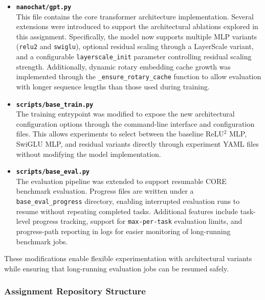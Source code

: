 \begin{itemize}

\item \textbf{\texttt{nanochat/gpt.py}} \\
This file contains the core transformer architecture implementation.
Several extensions were introduced to support the architectural ablations
explored in this assignment. Specifically, the model now supports multiple
MLP variants (\texttt{relu2} and \texttt{swiglu}), optional residual
scaling through a LayerScale variant, and a configurable
\texttt{layerscale\_init} parameter controlling residual scaling strength.
Additionally, dynamic rotary embedding cache growth was implemented through
the \texttt{\_ensure\_rotary\_cache} function to allow evaluation with longer
sequence lengths than those used during training.

\item \textbf{\texttt{scripts/base\_train.py}} \\
The training entrypoint was modified to expose the new architectural
configuration options through the command-line interface and configuration
files. This allows experiments to select between the baseline ReLU$^2$ MLP,
SwiGLU MLP, and residual variants directly through experiment YAML files
without modifying the model implementation.

\item \textbf{\texttt{scripts/base\_eval.py}} \\
The evaluation pipeline was extended to support resumable CORE benchmark
evaluation. Progress files are written under a \texttt{base\_eval\_progress}
directory, enabling interrupted evaluation runs to resume without repeating
completed tasks. Additional features include task-level progress tracking,
support for \texttt{max-per-task} evaluation limits, and progress-path
reporting in logs for easier monitoring of long-running benchmark jobs.

\end{itemize}

These modifications enable flexible experimentation with architectural
variants while ensuring that long-running evaluation jobs can be resumed
safely.

\subsubsection{Assignment Repository Structure}


\newcommand{\cmt}[1]{\normalfont{\textcolor{dircmt}{\textit{#1}}}}
\newcommand{\fcmt}[1]{\normalfont{\textcolor{filecmt}{\textit{#1}}}}

